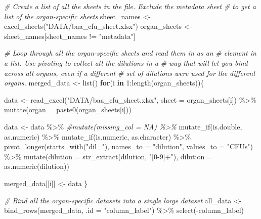 \documentclass[
]{book}
\newenvironment{Shaded}{\begin{snugshade}}{\end{snugshade}}
\newcommand{\AttributeTok}[1]{\textcolor[rgb]{0.77,0.63,0.00}{#1}}
\newcommand{\CommentTok}[1]{\textcolor[rgb]{0.56,0.35,0.01}{\textit{#1}}}
\newcommand{\ControlFlowTok}[1]{\textcolor[rgb]{0.13,0.29,0.53}{\textbf{#1}}}
\newcommand{\DecValTok}[1]{\textcolor[rgb]{0.00,0.00,0.81}{#1}}
\newcommand{\FunctionTok}[1]{\textcolor[rgb]{0.00,0.00,0.00}{#1}}
\newcommand{\NormalTok}[1]{#1}
\newcommand{\OtherTok}[1]{\textcolor[rgb]{0.56,0.35,0.01}{#1}}
\newcommand{\SpecialCharTok}[1]{\textcolor[rgb]{0.00,0.00,0.00}{#1}}
\newcommand{\StringTok}[1]{\textcolor[rgb]{0.31,0.60,0.02}{#1}}
\begin{document}
\begin{Shaded}
\begin{Highlighting}[]
\CommentTok{\# Create a list of all the sheets in the file. Exclude the metadata sheet }
\CommentTok{\# to get a list of the organ{-}specific sheets}
\NormalTok{sheet\_names }\OtherTok{\textless{}{-}} \FunctionTok{excel\_sheets}\NormalTok{(}\StringTok{"DATA/baa\_cfu\_sheet.xlsx"}\NormalTok{)}
\NormalTok{organ\_sheets }\OtherTok{\textless{}{-}}\NormalTok{ sheet\_names[sheet\_names }\SpecialCharTok{!=} \StringTok{"metadata"}\NormalTok{]}

\CommentTok{\# Loop through all the organ{-}specific sheets and read them in as an }
\CommentTok{\# element in a list. Use pivoting to collect all the dilutions in a }
\CommentTok{\# way that will let you bind across all organs, even if a different}
\CommentTok{\# set of dilutions were used for the different organs.}
\NormalTok{merged\_data }\OtherTok{\textless{}{-}} \FunctionTok{list}\NormalTok{()}
\ControlFlowTok{for}\NormalTok{(i }\ControlFlowTok{in} \DecValTok{1}\SpecialCharTok{:}\FunctionTok{length}\NormalTok{(organ\_sheets))\{}
  
\NormalTok{  data }\OtherTok{\textless{}{-}} \FunctionTok{read\_excel}\NormalTok{(}\StringTok{"DATA/baa\_cfu\_sheet.xlsx"}\NormalTok{, }
                     \AttributeTok{sheet =}\NormalTok{ organ\_sheets[i]) }\SpecialCharTok{\%\textgreater{}\%} 
    \FunctionTok{mutate}\NormalTok{(}\AttributeTok{organ =} \FunctionTok{paste0}\NormalTok{(organ\_sheets[i]))}
  
\NormalTok{  data }\OtherTok{\textless{}{-}}\NormalTok{ data }\SpecialCharTok{\%\textgreater{}\%} 
    \CommentTok{\#mutate(missing\_col = NA) \%\textgreater{}\% }
    \FunctionTok{mutate\_if}\NormalTok{(is.double, as.numeric) }\SpecialCharTok{\%\textgreater{}\%} 
    \FunctionTok{mutate\_if}\NormalTok{(is.numeric, as.character) }\SpecialCharTok{\%\textgreater{}\%} 
    \FunctionTok{pivot\_longer}\NormalTok{(}\FunctionTok{starts\_with}\NormalTok{(}\StringTok{"dil\_"}\NormalTok{), }\AttributeTok{names\_to =} \StringTok{"dilution"}\NormalTok{,}
                 \AttributeTok{values\_to =} \StringTok{"CFUs"}\NormalTok{) }\SpecialCharTok{\%\textgreater{}\%} 
    \FunctionTok{mutate}\NormalTok{(}\AttributeTok{dilution =} \FunctionTok{str\_extract}\NormalTok{(dilution, }\StringTok{"[0{-}9]+"}\NormalTok{),}
           \AttributeTok{dilution =} \FunctionTok{as.numeric}\NormalTok{(dilution))}
    
\NormalTok{  merged\_data[[i]] }\OtherTok{\textless{}{-}}\NormalTok{ data}
\NormalTok{\}}

\CommentTok{\# Bind all the organ{-}specific datasets into a single large dataset}
\NormalTok{all\_data }\OtherTok{\textless{}{-}} \FunctionTok{bind\_rows}\NormalTok{(merged\_data, }\AttributeTok{.id =} \StringTok{"column\_label"}\NormalTok{) }\SpecialCharTok{\%\textgreater{}\%} 
    \FunctionTok{select}\NormalTok{(}\SpecialCharTok{{-}}\NormalTok{column\_label)}
\end{Highlighting}
\end{Shaded}
\end{document}
